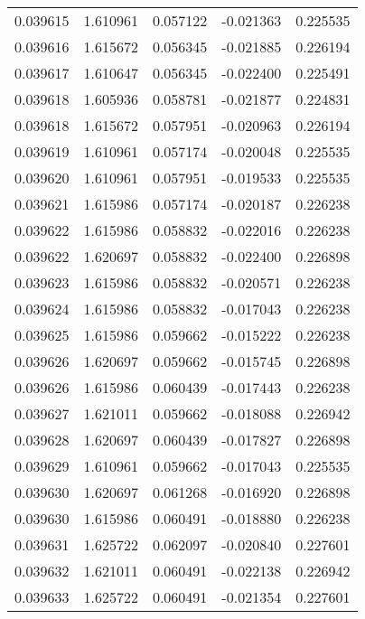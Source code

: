 \begin{tabular}{lrrrr}
0.039615    &  1.610961 &  0.057122 & -0.021363 &             0.225535 \\
0.039616    &  1.615672 &  0.056345 & -0.021885 &             0.226194 \\
0.039617    &  1.610647 &  0.056345 & -0.022400 &             0.225491 \\
0.039618    &  1.605936 &  0.058781 & -0.021877 &             0.224831 \\
0.039618    &  1.615672 &  0.057951 & -0.020963 &             0.226194 \\
0.039619    &  1.610961 &  0.057174 & -0.020048 &             0.225535 \\
0.039620    &  1.610961 &  0.057951 & -0.019533 &             0.225535 \\
0.039621    &  1.615986 &  0.057174 & -0.020187 &             0.226238 \\
0.039622    &  1.615986 &  0.058832 & -0.022016 &             0.226238 \\
0.039622    &  1.620697 &  0.058832 & -0.022400 &             0.226898 \\
0.039623    &  1.615986 &  0.058832 & -0.020571 &             0.226238 \\
0.039624    &  1.615986 &  0.058832 & -0.017043 &             0.226238 \\
0.039625    &  1.615986 &  0.059662 & -0.015222 &             0.226238 \\
0.039626    &  1.620697 &  0.059662 & -0.015745 &             0.226898 \\
0.039626    &  1.615986 &  0.060439 & -0.017443 &             0.226238 \\
0.039627    &  1.621011 &  0.059662 & -0.018088 &             0.226942 \\
0.039628    &  1.620697 &  0.060439 & -0.017827 &             0.226898 \\
0.039629    &  1.610961 &  0.059662 & -0.017043 &             0.225535 \\
0.039630    &  1.620697 &  0.061268 & -0.016920 &             0.226898 \\
0.039630    &  1.615986 &  0.060491 & -0.018880 &             0.226238 \\
0.039631    &  1.625722 &  0.062097 & -0.020840 &             0.227601 \\
0.039632    &  1.621011 &  0.060491 & -0.022138 &             0.226942 \\
0.039633    &  1.625722 &  0.060491 & -0.021354 &             0.227601 \\

\end{tabular}
